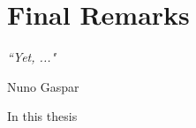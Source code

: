 
\chapter{Final Remarks} 
\label{chap:conclusion} 

\epigraph{\textit{“Yet, ..."}}{Nuno Gaspar}



\minitoc





	In this thesis





